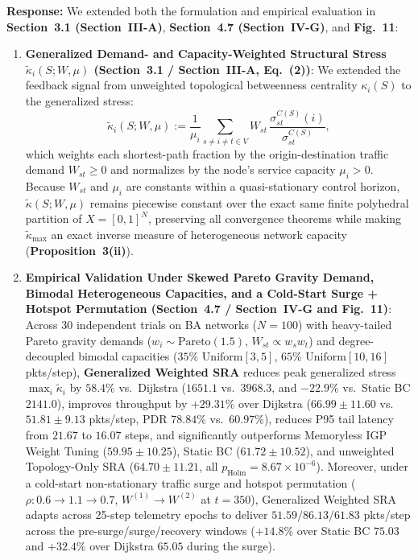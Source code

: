 \documentclass[11pt,a4paper]{article}
\begin{document}
\noindent\textbf{Response:} We extended both the formulation and empirical evaluation in \textbf{Section~3.1 (Section~III-A)}, \textbf{Section~4.7 (Section~IV-G)}, and \textbf{Fig.~11}:
\begin{enumerate}[leftmargin=1.8em]
    \item \textbf{Generalized Demand- and Capacity-Weighted Structural Stress $\widetilde{\kappa}_i(S;W,\mu)$ (Section~3.1 / Section~III-A, Eq.~(2))}: We extended the feedback signal from unweighted topological betweenness centrality $\kappa_i(S)$ to the generalized stress:
    \[
        \widetilde{\kappa}_i(S; W, \mu) := \frac{1}{\mu_i}\sum_{s \neq i \neq t \in V} W_{st}\,\frac{\sigma_{st}^{C(S)}(i)}{\sigma_{st}^{C(S)}},
    \]
    which weights each shortest-path fraction by the origin-destination traffic demand $W_{st} \ge 0$ and normalizes by the node's service capacity $\mu_i > 0$. Because $W_{st}$ and $\mu_i$ are constants within a quasi-stationary control horizon, $\widetilde{\kappa}(S; W, \mu)$ remains piecewise constant over the exact same finite polyhedral partition of $X=[0,1]^N$, preserving all convergence theorems while making $\widetilde{\kappa}_{\max}$ an exact inverse measure of heterogeneous network capacity (\textbf{Proposition~3(ii)}).
    \item \textbf{Empirical Validation Under Skewed Pareto Gravity Demand, Bimodal Heterogeneous Capacities, and a Cold-Start Surge + Hotspot Permutation (Section~4.7 / Section~IV-G and Fig.~11)}: Across 30 independent trials on BA networks ($N=100$) with heavy-tailed Pareto gravity demands ($w_i \sim \mathrm{Pareto}(1.5)$, $W_{st} \propto w_s w_t$) and degree-decoupled bimodal capacities ($35\%$ $\mathrm{Uniform}[3,5]$, $65\%$ $\mathrm{Uniform}[10,16]$ pkts/step), \textbf{Generalized Weighted SRA} reduces peak generalized stress $\max_i\widetilde{\kappa}_i$ by \textbf{$58.4\%$} vs.\ Dijkstra ($1651.1$ vs.\ $3968.3$, and $-22.9\%$ vs.\ Static BC $2141.0$), improves throughput by \textbf{$+29.31\%$} over Dijkstra ($66.99 \pm 11.60$ vs.\ $51.81 \pm 9.13$ pkts/step, PDR $78.84\%$ vs.\ $60.97\%$), reduces P95 tail latency from $21.67$ to $16.07$ steps, and significantly outperforms Memoryless IGP Weight Tuning ($59.95 \pm 10.25$), Static BC ($61.72 \pm 10.52$), and unweighted Topology-Only SRA ($64.70 \pm 11.21$, all $p_{\text{Holm}}=8.67 \times 10^{-6}$). Moreover, under a cold-start non-stationary traffic surge and hotspot permutation ($\rho: 0.6 \to 1.1 \to 0.7$, $W^{(1)}\to W^{(2)}$ at $t=350$), Generalized Weighted SRA adapts across 25-step telemetry epochs to deliver $51.59 / 86.13 / 61.83$ pkts/step across the pre-surge/surge/recovery windows ($+14.8\%$ over Static BC $75.03$ and $+32.4\%$ over Dijkstra $65.05$ during the surge).
\end{enumerate}
\end{document}
